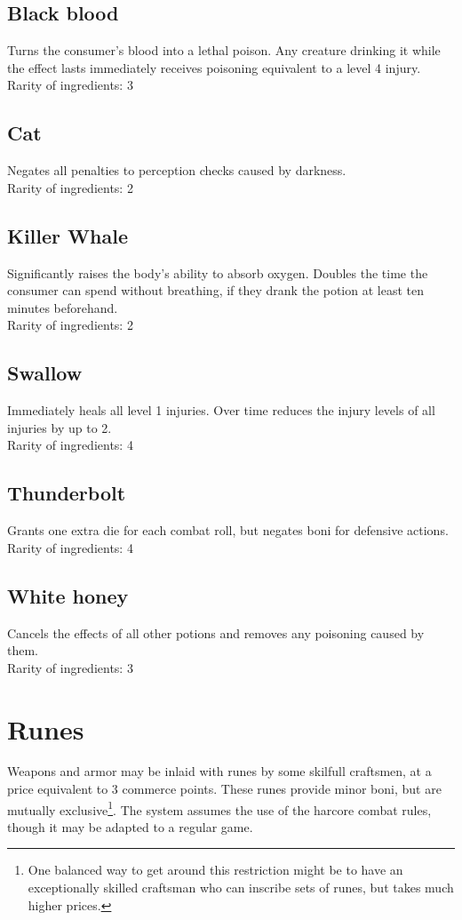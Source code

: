 \documentclass[parskip=full,11pt,%
footheight=38pt]{scrreport}
\begin{document}
\subsection{Black blood}
Turns the consumer's blood into a lethal poison. Any creature drinking it while the effect lasts immediately receives
poisoning equivalent to a level 4 injury.
\\[2ex]
Rarity of ingredients: 3

\subsection{Cat}
Negates all penalties to perception checks caused by darkness.
\\[2ex]
Rarity of ingredients: 2

\subsection{Killer Whale}
Significantly raises the body's ability to absorb oxygen. Doubles the time the consumer can spend without breathing,
if they drank the potion at least ten minutes beforehand.
\\[2ex]
Rarity of ingredients: 2

\subsection{Swallow}
Immediately heals all level 1 injuries. Over time reduces the injury levels of all injuries by up to 2.
\\[2ex]
Rarity of ingredients: 4

\subsection{Thunderbolt}
Grants one extra die for each combat roll, but negates boni for defensive actions.
\\[2ex]
Rarity of ingredients: 4

\subsection{White honey}
Cancels the effects of all other potions and removes any poisoning caused by them.
\\[2ex]
Rarity of ingredients: 3

\section{Runes}
Weapons and armor may be inlaid with runes by some skilfull craftsmen, at a price equivalent to
3 commerce points. These runes provide minor boni, but are mutually exclusive\footnote{One balanced way
	to get around this restriction might be to have an exceptionally skilled craftsman who can inscribe
	sets of runes, but takes much higher prices.}.
The system assumes the use of the harcore combat rules, though it may be adapted to a regular game.
\end{document}
